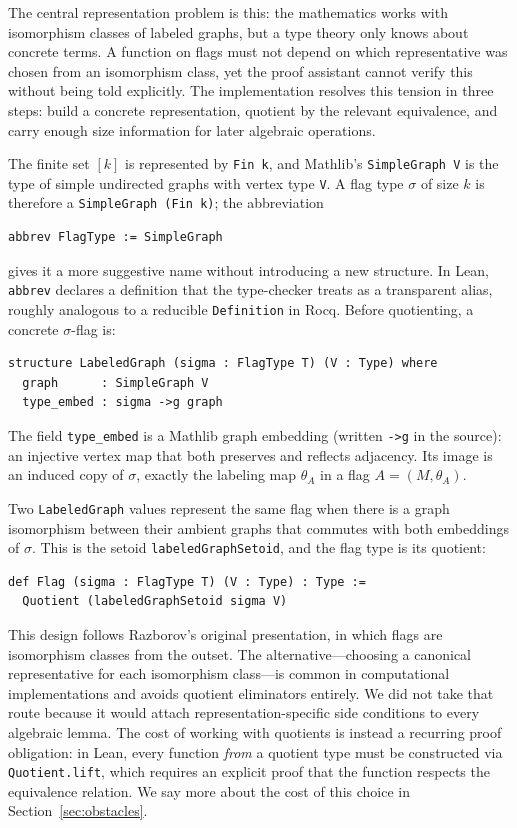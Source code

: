 \documentclass{article}
\newcommand{\lean}[1]{\texttt{#1}}
\begin{document}
The central representation problem is this: the mathematics works with
isomorphism classes of labeled graphs, but a type theory only knows about
concrete terms.  A function on flags must not depend on which representative
was chosen from an isomorphism class, yet the proof assistant cannot verify
this without being told explicitly.  The implementation resolves this tension
in three steps: build a concrete representation, quotient by the relevant
equivalence, and carry enough size information for later algebraic operations.

The finite set $[k]$ is represented by \lean{Fin k}, and Mathlib's
\lean{SimpleGraph V} is the type of simple undirected graphs with vertex type
\lean{V}.  A flag type $\sigma$ of size $k$ is therefore a
\lean{SimpleGraph (Fin k)}; the abbreviation
\begin{lstlisting}
abbrev FlagType := SimpleGraph
\end{lstlisting}
gives it a more suggestive name without introducing a new structure.  In Lean,
\lean{abbrev} declares a definition that the type-checker treats as a
transparent alias, roughly analogous to a reducible \lean{Definition} in Rocq.
Before quotienting, a concrete $\sigma$-flag is:
\begin{lstlisting}
structure LabeledGraph (sigma : FlagType T) (V : Type) where
  graph      : SimpleGraph V
  type_embed : sigma ->g graph
\end{lstlisting}
The field \lean{type\_embed} is a Mathlib graph embedding (written \lean{->g}
in the source): an injective vertex map that both preserves and reflects
adjacency.  Its image is an induced copy of $\sigma$, exactly the labeling map
$\theta_A$ in a flag $A = (M, \theta_A)$.

Two \lean{LabeledGraph} values represent the same flag when there is a graph
isomorphism between their ambient graphs that commutes with both embeddings of
$\sigma$.  This is the setoid \lean{labeledGraphSetoid}, and the flag type is
its quotient:
\begin{lstlisting}
def Flag (sigma : FlagType T) (V : Type) : Type :=
  Quotient (labeledGraphSetoid sigma V)
\end{lstlisting}
This design follows Razborov's original presentation, in which flags are
isomorphism classes from the outset.  The alternative---choosing a canonical
representative for each isomorphism class---is common in computational
implementations and avoids quotient eliminators entirely.  We did not take that
route because it would attach representation-specific side conditions to every
algebraic lemma.  The cost of working with quotients is instead a recurring
proof obligation: in Lean, every function \emph{from} a quotient type must be
constructed via \lean{Quotient.lift}, which requires an explicit proof that the
function respects the equivalence relation.  We say more about the cost of
this choice in Section~\ref{sec:obstacles}.
\end{document}
